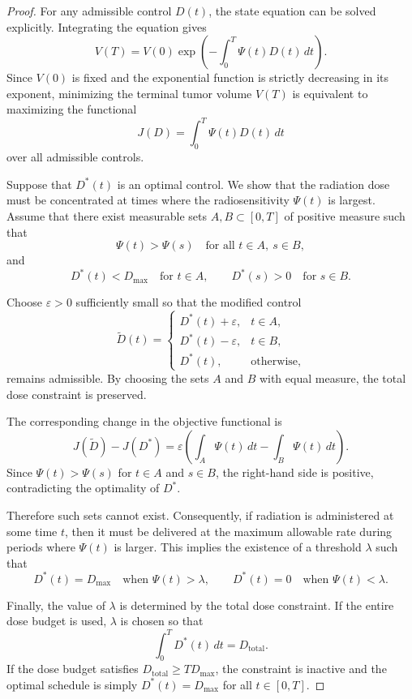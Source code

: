 \documentclass[11pt, reqno]{amsart}
\numberwithin{equation}{section}
\theoremstyle{definition}
\begin{document}
\begin{proof}
For any admissible control $D(t)$, the state equation can be solved explicitly. Integrating the equation gives
\[
V(T) = V(0)\exp\!\left(-\int_0^T \Psi(t)D(t)\,dt\right).
\]
Since $V(0)$ is fixed and the exponential function is strictly decreasing in its exponent, minimizing the terminal tumor volume
$V(T)$ is equivalent to maximizing the functional
\[
J(D) = \int_0^T \Psi(t)D(t)\,dt
\]
over all admissible controls.

Suppose that $D^*(t)$ is an optimal control. We show that the radiation dose must be concentrated at times where the radiosensitivity $\Psi(t)$ is largest. Assume that there exist measurable sets $A,B\subset[0,T]$ of positive measure such that
\[
\Psi(t)>\Psi(s) \quad \text{for all } t\in A,\ s\in B,
\]
and
\[
D^*(t) < D_{\max} \quad \text{for } t\in A, 
\qquad
D^*(s) > 0 \quad \text{for } s\in B.
\]

Choose $\varepsilon>0$ sufficiently small so that the modified control
\[
\widetilde D(t) =
\begin{cases}
D^*(t)+\varepsilon, & t\in A,\\
D^*(t)-\varepsilon, & t\in B,\\
D^*(t), & \text{otherwise},
\end{cases}
\]
remains admissible. By choosing the sets $A$ and $B$ with equal measure, the total dose constraint is preserved.

The corresponding change in the objective functional is
\[
J(\widetilde D) - J(D^*)
= \varepsilon
\left(
\int_A \Psi(t)\,dt
-
\int_B \Psi(t)\,dt
\right).
\]
Since $\Psi(t)>\Psi(s)$ for $t\in A$ and $s\in B$, the right-hand side is positive, contradicting the optimality of $D^*$.

Therefore such sets cannot exist. Consequently, if radiation is administered at some time $t$, then it must be delivered at the
maximum allowable rate during periods where $\Psi(t)$ is larger. This implies the existence of a threshold $\lambda$ such that
\[
D^*(t)=D_{\max} \quad \text{when } \Psi(t)>\lambda,
\qquad
D^*(t)=0 \quad \text{when } \Psi(t)<\lambda.
\]

Finally, the value of $\lambda$ is determined by the total dose constraint. If the entire dose budget is used, $\lambda$ is chosen so that
\[
\int_0^T D^*(t)\,dt = D_{\mathrm{total}}.
\]
If the dose budget satisfies $D_{\mathrm{total}} \ge T D_{\max}$, the constraint is inactive and the optimal schedule is simply
$D^*(t) = D_{\max}$ for all $t\in[0,T]$.
\end{proof}
\end{document}
